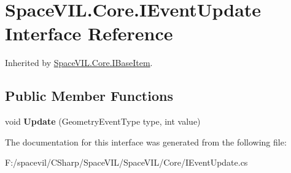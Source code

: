 \hypertarget{interface_space_v_i_l_1_1_core_1_1_i_event_update}{}\section{Space\+V\+I\+L.\+Core.\+I\+Event\+Update Interface Reference}
\label{interface_space_v_i_l_1_1_core_1_1_i_event_update}


Inherited by \mbox{\hyperlink{interface_space_v_i_l_1_1_core_1_1_i_base_item}{Space\+V\+I\+L.\+Core.\+I\+Base\+Item}}.

\subsection*{Public Member Functions}
\begin{DoxyCompactItemize}
\item 
\mbox{\label{interface_space_v_i_l_1_1_core_1_1_i_event_update_a7cef5587515d1c89297cd2848ea6ac65}} 
void {\bfseries Update} (Geometry\+Event\+Type type, int value)
\end{DoxyCompactItemize}


The documentation for this interface was generated from the following file\+:\begin{DoxyCompactItemize}
\item 
F\+:/spacevil/\+C\+Sharp/\+Space\+V\+I\+L/\+Space\+V\+I\+L/\+Core/I\+Event\+Update.\+cs\end{DoxyCompactItemize}
